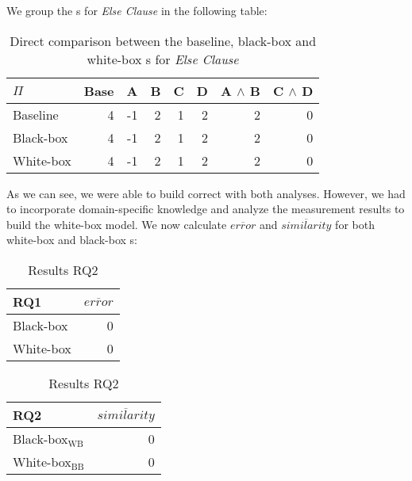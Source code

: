 We group the {\perfInfluenceModel}s for \emph{Else Clause} in the following table:

\begin{table}[H]
    \centering
    \begin{tabular}{lrrrrrrr}
    \toprule
    $\Pi$    & Base & A & B & C & D & A $\land$ B & C $\land$ D  \\ \midrule
    Baseline & 4    & -1 & 2 & 1 & 2 & 2           & 0            \\
    Black-box & 4    & -1 & 2 & 1 & 2 & 2           & 0           \\
    White-box & 4    & -1 & 2 & 1 & 2 & 2           & 0           \\ \bottomrule
    \end{tabular}  
    \caption{Direct comparison between the baseline, black-box and white-box {\perfInfluenceModel}s for \emph{Else Clause}}\label{aggr:results-else-clause}
\end{table}

As we can see, we were able to build correct {\perfInfluenceModel} with both analyses. 
However, we had to incorporate domain-specific knowledge and analyze the measurement results to build the white-box model. 
We now calculate $\overline{error}$ and $\overline{similarity}$ for both white-box and black-box {\perfInfluenceModel}s:

\begin{table}[H]
    \begin{minipage}{.5\linewidth}
        \centering
        \begin{tabular}{lr}
        \toprule
        RQ1     & $\overline{error}$         \\ \midrule
        Black-box & 0              \\
        White-box & 0              \\ \bottomrule
        \end{tabular}  
        \caption{Results RQ1}
    \end{minipage}%
    \begin{minipage}{.5\linewidth}
        \centering
        \begin{tabular}{lr}
            \toprule
            RQ2     & $\overline{similarity}$   \\ \midrule
            Black-box$_\text{WB}$ & 0              \\
            White-box$_\text{BB}$ & 0              \\ \bottomrule
            \end{tabular}  
            \caption{Results RQ2}
    \end{minipage} 
    \end{table}

